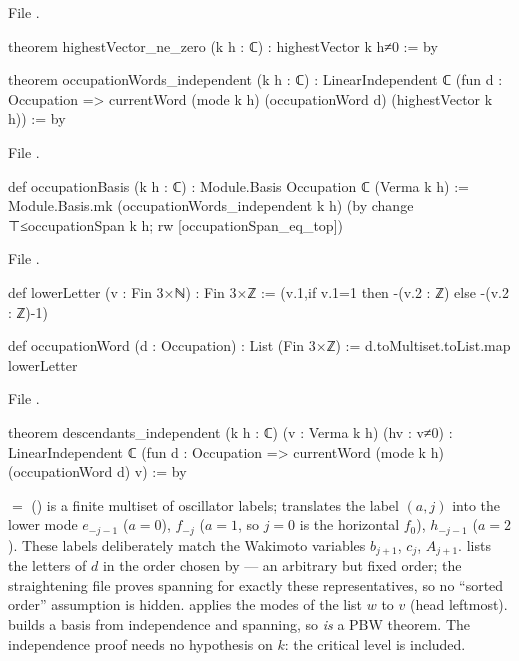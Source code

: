 \noindent File .
\begin{leancode}
theorem highestVector_ne_zero (k h : ℂ) : highestVector k h≠0 := by

theorem occupationWords_independent (k h : ℂ) :
    LinearIndependent ℂ (fun d : Occupation => currentWord (mode k h)
      (occupationWord d) (highestVector k h)) := by
\end{leancode}
\noindent File .
\begin{leancode}
def occupationBasis (k h : ℂ) : Module.Basis Occupation ℂ (Verma k h) :=
  Module.Basis.mk (occupationWords_independent k h)
    (by change ⊤≤occupationSpan k h; rw [occupationSpan_eq_top])
\end{leancode}
\noindent File .
\begin{leancode}
def lowerLetter (v : Fin 3×ℕ) : Fin 3×ℤ :=
  (v.1,if v.1=1 then -(v.2 : ℤ) else -(v.2 : ℤ)-1)

def occupationWord (d : Occupation) : List (Fin 3×ℤ) := d.toMultiset.toList.map lowerLetter
\end{leancode}
\noindent File .
\begin{leancode}
theorem descendants_independent (k h : ℂ) (v : Verma k h) (hv : v≠0) :
    LinearIndependent ℂ (fun d : Occupation => currentWord (mode k h) (occupationWord d) v) := by
\end{leancode}

\begin{dictionary}
 $=$  () is a finite multiset of
oscillator labels;  translates the label $(a,j)$ into the lower mode $e_{-j-1}$ ($a=0$),
$f_{-j}$ ($a=1$, so $j=0$ is the horizontal $f_0$), $h_{-j-1}$ ($a=2$). These labels deliberately match the
Wakimoto variables $b_{j+1}$, $c_j$, $A_{j+1}$.  lists the letters of $d$ in the
order chosen by  --- an arbitrary but fixed order; the straightening file proves
spanning for exactly these representatives, so no ``sorted order'' assumption is hidden.
 applies the modes of the list $w$ to $v$ (head leftmost). 
builds a basis from independence and spanning, so  \emph{is} a PBW theorem.
The independence proof needs no hypothesis on $k$: the critical level is included.
\end{dictionary}

